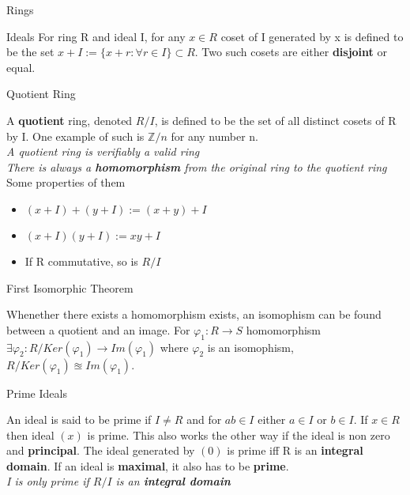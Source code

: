 \documentclass[12pt, letterpaper]{article}
\begin{document}
\begin{section}{Rings}
\begin{subsection}{Ideals}
    For ring R and ideal I, for any \(x \in R\) coset of I generated by x is
    defined to be the set \(x + I := \{x + r : \forall r \in I \} \subset R\). Two such
    cosets are either \textbf{disjoint} or equal.

    \begin{subsubsection}{Quotient Ring}

      A \textbf{quotient} ring, denoted \(R/I\), is defined to be the set of
      all distinct cosets of R by I. One example of such is \(\mathbb{Z}/n\) for
      any number n. \\
      \emph{A quotient ring is verifiably a valid ring} \\
      \emph{There is always a \textbf{homomorphism} from the original ring to
      the quotient ring} \\
      Some properties of them
      \begin{itemize}
        \item \((x + I) + (y + I) := (x + y) + I\)
        \item \((x + I)(y + I) := xy + I\)
        \item If R commutative, so is \(R/I\)
      \end{itemize}

    \end{subsubsection}

    \begin{subsubsection}{First Isomorphic Theorem}

      Whenether there exists a homomorphism exists, an isomophism can be found
      between a quotient and an image. For \(\varphi_{1}: R \to S\) homomorphism
      \(\exists \varphi_{2}:R/Ker(\varphi_{1}) \to Im(\varphi_{1})\) where \(\varphi_{2}\) is
      an isomophism, \(R/Ker(\varphi_{1}) \approxeq Im(\varphi_{1})\).

    \end{subsubsection}

    \begin{subsubsection}{Prime Ideals}

      An ideal is said to be prime if \(I \neq R\) and for \(ab \in I\) either
      \(a \in I\) or \(b \in I\). If \(x \in R\) then ideal \((x)\) is prime.
      This also works the other way if the ideal is non zero and \textbf{principal}.
      The ideal generated by \((0)\) is prime iff R is an \textbf{integral domain}.
      If an ideal is \textbf{maximal}, it also has to be \textbf{prime}.\\
      \emph{I is only prime if \(R/I\) is an \textbf{integral domain}}


\end{subsubsection}
\end{subsection}
\end{section}
\end{document}
